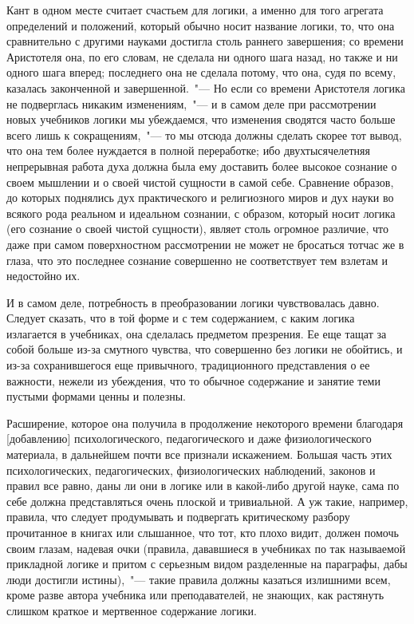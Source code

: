 Кант в одном месте\endnotemark{} считает счастьем для логики,
а именно для того агрегата определений и положений,
который обычно носит название логики, то, что она
сравнительно с другими науками достигла столь раннего
завершения; со времени Аристотеля она, по его словам,
не сделала ни одного шага назад, но также и ни одного
шага вперед; последнего она не сделала потому, что она,
судя по всему, казалась законченной и завершенной.~"---
Но если со времени Аристотеля логика не подверглась
никаким изменениям,~"--- и в самом деле при рассмотрении
новых учебников логики мы убеждаемся, что
изменения сводятся часто больше всего лишь к сокращениям,~"---
то мы отсюда должны сделать скорее тот вывод,
что она тем более нуждается в полной переработке; ибо
двухтысячелетняя непрерывная работа духа должна
была ему доставить более высокое сознание о своем мышлении
и о своей чистой сущности в самой себе. Сравнение
образов, до которых поднялись дух практического и религиозного
миров и дух науки во всякого рода реальном
и идеальном сознании, с образом, который носит логика
(его сознание о своей чистой сущности), являет столь
огромное различие, что даже при самом поверхностном
рассмотрении не может не бросаться тотчас же в глаза,
что это последнее сознание совершенно не соответствует
тем взлетам и недостойно их.


И в самом деле, потребность в преобразовании логики
чувствовалась давно. Следует сказать, что в той форме
и с тем содержанием, с каким логика излагается в учебниках,
она сделалась предметом презрения. Ее еще тащат
за собой больше из-за смутного чувства, что совершенно
без логики не обойтись, и из-за сохранившегося еще привычного,
традиционного представления о ее важности,
нежели из убеждения, что то обычное содержание и занятие
теми пустыми формами ценны и полезны.

Расширение, которое она получила в продолжение
некоторого времени благодаря [добавлению] психологического,
педагогического и даже физиологического материала,
в дальнейшем почти все признали искажением.
Большая часть этих психологических, педагогических,
физиологических наблюдений, законов и правил все равно,
даны ли они в логике или в какой-либо другой науке,
сама по себе должна представляться очень плоской и тривиальной.
А уж такие, например, правила, что следует
продумывать и подвергать критическому разбору прочитанное
в книгах или слышанное, что тот, кто плохо видит,
должен помочь своим глазам, надевая очки (правила,
дававшиеся в учебниках по так называемой прикладной
логике и притом с серьезным видом разделенные на
параграфы, дабы люди достигли истины),~"--- такие правила
должны казаться излишними всем, кроме разве автора
учебника или преподавателей, не знающих, как растянуть
слишком краткое и мертвенное содержание
логики\endnotemark{}.

